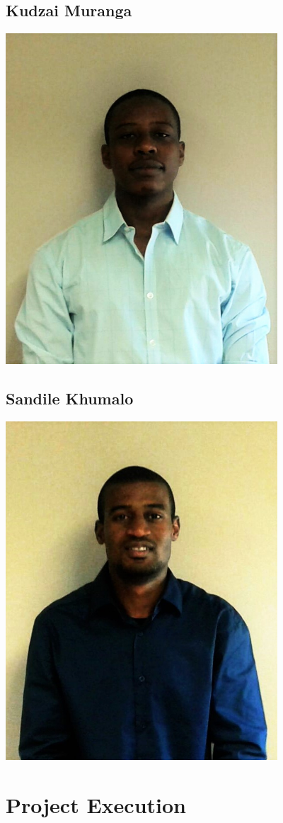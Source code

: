 \documentclass[a4paper,12pt]{article}
\begin{document}
\subsection{Kudzai Muranga }
\includegraphics[width=4in]{Kudzai.jpg}\\[0.4cm] 
\subsection{Sandile Khumalo }
\includegraphics[width=4in]{Sandile.jpg}

\section{Project Execution}
\end{document}
